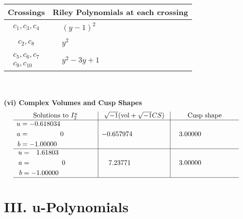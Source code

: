 \documentclass[1p]{elsarticle_modified}
\theoremstyle{definition}
\newcommand{\I}{\sqrt{-1}}
\begin{document}
\begin{tabular}{m{50pt}|m{274pt}}
Crossings & \hspace{64pt}Riley Polynomials at each crossing \\
\hline $$\begin{aligned}c_{1},c_{3},c_{4}\end{aligned}$$&$\begin{aligned}
&(y-1)^2
\end{aligned}$\\
\hline $$\begin{aligned}c_{2},c_{8}\end{aligned}$$&$\begin{aligned}
&y^2
\end{aligned}$\\
\hline $$\begin{aligned}c_{5},c_{6},c_{7}\\c_{9},c_{10}\end{aligned}$$&$\begin{aligned}
&y^2-3 y+1
\end{aligned}$\\
\hline
\end{tabular}\\~\\
\newpage\flushleft \textbf{(vi) Complex Volumes and Cusp Shapes}
$$\begin{array}{c|c|c}  
\text{Solutions to }I^u_{2}& \I (\text{vol} + \sqrt{-1}CS) & \text{Cusp shape}\\
 \hline 
\begin{aligned}
u &= -0.618034\phantom{ +0.000000I} \\
a &= \phantom{-0.000000 } 0 \\
b &= -1.00000\phantom{ +0.000000I}\end{aligned}
 & -0.657974\phantom{ +0.000000I} & \phantom{-}3.00000\phantom{ +0.000000I} \\ \hline\begin{aligned}
u &= \phantom{-}1.61803\phantom{ +0.000000I} \\
a &= \phantom{-0.000000 } 0 \\
b &= -1.00000\phantom{ +0.000000I}\end{aligned}
 & \phantom{-}7.23771\phantom{ +0.000000I} & \phantom{-}3.00000\phantom{ +0.000000I}\\
 \hline 
 \end{array}$$\newpage
\newpage\renewcommand{\arraystretch}{1}
\centering \section*{ III. u-Polynomials}
\end{document}
